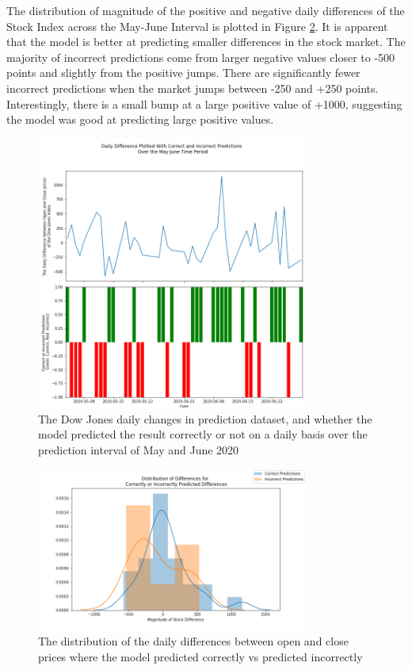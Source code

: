 The distribution of magnitude of the positive and negative daily differences of the Stock Index across the May-June Interval is plotted in Figure \ref{fig:distmodel}.  It is apparent that the model is better at predicting smaller differences in the stock market. The majority of incorrect predictions come from larger negative values closer to -500 points and slightly from the positive jumps. There are significantly fewer incorrect predictions when the market jumps between -250 and +250 points. Interestingly, there is a small bump at a large positive value of +1000, suggesting the model was good at predicting large positive values. 

\begin{figure}[H]
	\centering
	\includegraphics[width=0.8\textwidth]{images/model_pred_time.png}
	\caption{The Dow Jones daily changes in prediction dataset, and whether the model predicted the result correctly or not on a daily basis over the prediction interval of May and June 2020}
	\label{fig:modelpred}
\end{figure}


\begin{figure}[H]
	\centering
	\includegraphics[width=0.8\textwidth]{images/dist_of_model.png}
	\caption{The distribution of the daily differences between open and close prices where the model predicted correctly vs predicted incorrectly}
	\label{fig:distmodel}
\end{figure}

